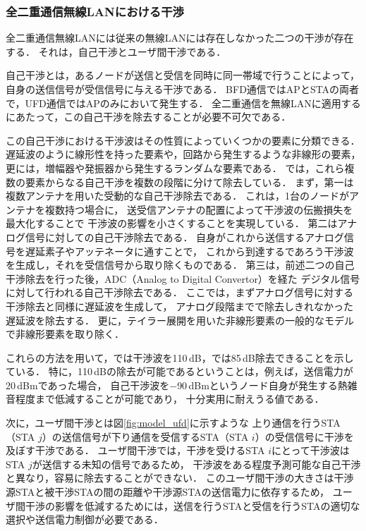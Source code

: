 \documentclass[master]{kuisthesis}		%
\begin{document}
		\subsubsection{全二重通信無線LANにおける干渉}\label{sec:interference}
			全二重通信無線LANには従来の無線LANには存在しなかった二つの干渉が存在する．
			それは，自己干渉とユーザ間干渉である．
			\par
			自己干渉とは，あるノードが送信と受信を同時に同一帯域で行うことによって，
			自身の送信信号が受信信号に与える干渉である．
			BFD通信ではAPとSTAの両者で，UFD通信ではAPのみにおいて発生する．
			全二重通信を無線LANに適用するにあたって，この自己干渉を除去することが必要不可欠である．

			\par
			この自己干渉における干渉波はその性質によっていくつかの要素に分類できる．
			遅延波のように線形性を持った要素や，回路から発生するような非線形の要素，
			更には，増幅器や発振器から発生するランダムな要素である．
			\cite{stanford1,fdmac}では，これら複数の要素からなる自己干渉を複数の段階に分けて除去している．
			まず，第一は複数アンテナを用いた受動的な自己干渉除去である．
			これは，1台のノードがアンテナを複数持つ場合に，
			送受信アンテナの配置によって干渉波の伝搬損失を最大化することで
			干渉波の影響を小さくすることを実現している．
			第二はアナログ信号に対しての自己干渉除去である．
			自身がこれから送信するアナログ信号を遅延素子やアッテネータに通すことで，
			これから到達するであろう干渉波を生成し，それを受信信号から取り除くものである．
			第三は，前述二つの自己干渉除去を行った後，ADC（Analog to Digital Convertor）を経た
			デジタル信号に対して行われる自己干渉除去である．
			ここでは，まずアナログ信号に対する干渉除去と同様に遅延波を生成して，
			アナログ段階までで除去しきれなかった遅延波を除去する．
			更に，テイラー展開を用いた非線形要素の一般的なモデルで非線形要素を取り除く．

			\par
			これらの方法を用いて，\cite{stanford1}では干渉波を110\,dB，\cite{fdmac}では85\,dB除去できることを示している．
			特に，110\,dBの除去が可能であるということは，例えば，送信電力が20\,dBmであった場合，
			自己干渉波を$-$90\,dBmというノード自身が発生する熱雑音程度まで低減することが可能であり，
			十分実用に耐えうる値である．
			\par
			次に，ユーザ間干渉とは図\ref{fig:model_ufd}に示すような
			上り通信を行うSTA（STA $j$）の送信信号が下り通信を受信するSTA（STA $i$）の受信信号に干渉を及ぼす干渉である．
			ユーザ間干渉では，干渉を受けるSTA $i$にとって干渉波はSTA $j$が送信する未知の信号であるため，
			干渉波をある程度予測可能な自己干渉と異なり，容易に除去することができない．
			このユーザ間干渉の大きさは干渉源STAと被干渉STAの間の距離や干渉源STAの送信電力に依存するため，
			ユーザ間干渉の影響を低減するためには，送信を行うSTAと受信を行うSTAの適切な選択や送信電力制御が必要である．
\end{document}

